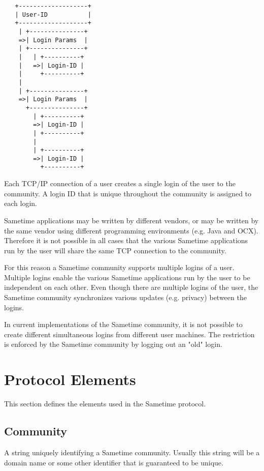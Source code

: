\documentclass[titlepage,oneside]{book}
\begin{document}
\begin{verbatim}
   +-------------------+
   | User-ID           |
   +-------------------+
    | +---------------+
    =>| Login Params  |
    | +---------------+
    |   | +----------+
    |   =>| Login-ID |
    |     +----------+
    |
    | +---------------+
    =>| Login Params  |
      +---------------+
        | +----------+
        =>| Login-ID |
        | +----------+
        |
        | +----------+
        =>| Login-ID |
          +----------+
\end{verbatim}

\par{} Each TCP/IP connection of a user creates a single login of the
user to the community. A login ID that is unique throughout the
community is assigned to each login.

\par{} Sametime applications may be written by different vendors, or
may be written by the same vendor using different programming
environments (e.g. Java and OCX). Therefore it is not possible in all
cases that the various Sametime applications run by the user will
share the same TCP connection to the community.

\par{} For this reason a Sametime community supports multiple logins
of a user. Multiple logins enable the various Sametime applications
run by the user to be independent on each other. Even though there are
multiple logins of the user, the Sametime community synchronizes
various updates (e.g. privacy) between the logins.

\par{} In current implementations of the Sametime community, it is not
possible to create different simultaneous logins from different user
machines. The restriction is enforced by the Sametime community by
logging out an "old" login.

\chapter{Protocol Elements}

\par{} This section defines the elements used in the Sametime
protocol.

\section{Community}

\par{} A string uniquely identifying a Sametime community. Usually
this string will be a domain name or some other identifier that is
guaranteed to be unique.
\end{document}
